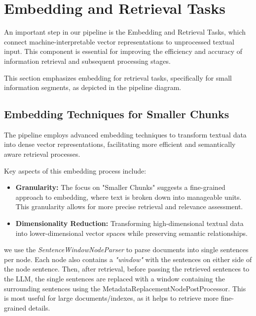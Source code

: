 \section{Embedding and Retrieval Tasks}\label{sec:embedding-and-retrieval-tasks}
An important step in our pipeline is the Embedding and Retrieval Tasks, which connect machine-interpretable vector representations to unprocessed textual input.
This component is essential for improving the efficiency and accuracy of information retrieval and subsequent processing stages.

This section emphasizes embedding for retrieval tasks, specifically for small information segments, as depicted in the pipeline diagram.

\subsection{Embedding Techniques for Smaller Chunks}\label{subsec:embedding-techniques-for-smaller-chunks}
The pipeline employs advanced embedding techniques to transform textual data into dense vector representations, facilitating more efficient and semantically aware retrieval processes.

Key aspects of this embedding process include:
\begin{itemize}
    \item \textbf{Granularity:} The focus on "Smaller Chunks" suggests a fine-grained approach to embedding, where text is broken down into manageable units. This granularity allows for more precise retrieval and relevance assessment.
    \item \textbf{Dimensionality Reduction:} Transforming high-dimensional textual data into lower-dimensional vector spaces while preserving semantic relationships.
\end{itemize}

we use the \textit{SentenceWindowNodeParser} to parse documents into single sentences per node.
Each node also contains a \textit{"window"} with the sentences on either side of the node sentence.
Then, after retrieval, before passing the retrieved sentences to the LLM, the single sentences are replaced with a window containing the surrounding sentences using the MetadataReplacementNodePostProcessor.
This is most useful for large documents/indexes, as it helps to retrieve more fine-grained details.

